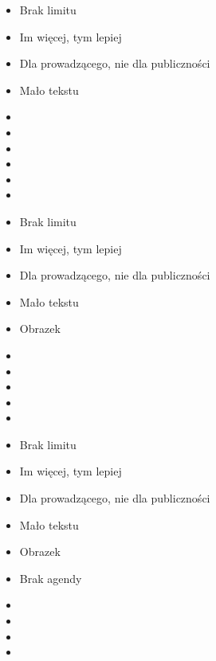 \documentclass{beamer}
\begin{document}
\begin{frame}{}
	\begin{Large}
		\begin{itemize}
			\item Brak limitu
			\item Im więcej, tym lepiej
			\item Dla prowadzącego, nie dla publiczności
			\item Mało tekstu
			\item 
			\item 
			\item 
			\item 
			\item 
			\item 
		\end{itemize}
	\end{Large}
\end{frame}

\begin{frame}{}
	\begin{Large}
		\begin{itemize}
			\item Brak limitu
			\item Im więcej, tym lepiej
			\item Dla prowadzącego, nie dla publiczności
			\item Mało tekstu
			\item Obrazek
			\item 
			\item 
			\item 
			\item 
			\item 
		\end{itemize}
	\end{Large}
\end{frame}

\begin{frame}{}
	\begin{Large}
		\begin{itemize}
			\item Brak limitu
			\item Im więcej, tym lepiej
			\item Dla prowadzącego, nie dla publiczności
			\item Mało tekstu
			\item Obrazek
			\item Brak agendy
			\item 
			\item 
			\item 
			\item 
		\end{itemize}
	\end{Large}
\end{frame}
\end{document}
